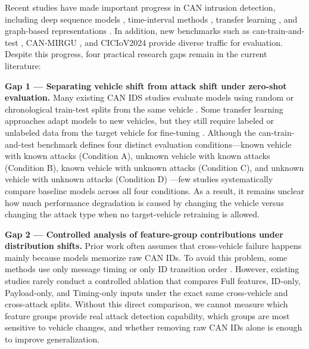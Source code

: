 \documentclass[12pt, a4paper, reqno, oneside]{book}
\begin{document}
Recent studies have made important progress in CAN intrusion detection, including deep sequence models \cite{song2020invehicle}, time-interval methods \cite{lee2017otids}, transfer learning \cite{tariq2020cantransfer}, and graph-based representations \cite{islam2020graph, meng2023gbids}. In addition, new benchmarks such as can-train-and-test \cite{lampe2023cantrain, lampe2024curated}, CAN-MIRGU \cite{rajapaksha2024canmirgu}, and CICIoV2024 \cite{neto2024ciciov2024} provide diverse traffic for evaluation. Despite this progress, four practical research gaps remain in the current literature:

\textbf{Gap 1 --- Separating vehicle shift from attack shift under zero-shot evaluation.} Many existing CAN IDS studies evaluate models using random or chronological train-test splits from the same vehicle \cite{song2020invehicle, lee2017otids}. Some transfer learning approaches adapt models to new vehicles, but they still require labeled or unlabeled data from the target vehicle for fine-tuning \cite{tariq2020cantransfer}. Although the can-train-and-test benchmark defines four distinct evaluation conditions---known vehicle with known attacks (Condition A), unknown vehicle with known attacks (Condition B), known vehicle with unknown attacks (Condition C), and unknown vehicle with unknown attacks (Condition D) \cite{lampe2023cantrain, lampe2024curated}---few studies systematically compare baseline models across all four conditions. As a result, it remains unclear how much performance degradation is caused by changing the vehicle versus changing the attack type when no target-vehicle retraining is allowed.

\textbf{Gap 2 --- Controlled analysis of feature-group contributions under distribution shifts.} Prior work often assumes that cross-vehicle failure happens mainly because models memorize raw CAN IDs. To avoid this problem, some methods use only message timing \cite{lee2017otids} or only ID transition order \cite{islam2020graph}. However, existing studies rarely conduct a controlled ablation that compares Full features, ID-only, Payload-only, and Timing-only inputs under the exact same cross-vehicle and cross-attack splits. Without this direct comparison, we cannot measure which feature groups provide real attack detection capability, which groups are most sensitive to vehicle changes, and whether removing raw CAN IDs alone is enough to improve generalization.
\end{document}
